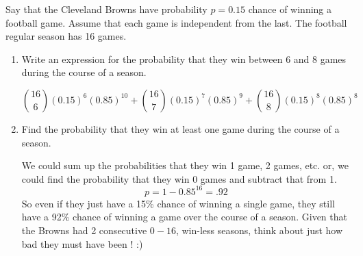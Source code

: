 \question Say that the Cleveland Browns have probability $p = 0.15$ chance of winning a football game. Assume that each game is independent from the last. The football regular season has 16 games.
\begin{enumerate}[label=(\alph*)]
    \item Write an expression for the probability that they win between $6$ and $8$ games during the course of a season. 
    \begin{solution} [.5 cm]
    \[\binom{16}{6}(0.15)^6(0.85)^{10} + \binom{16}{7}(0.15)^7(0.85)^9 + \binom{16}{8}(0.15)^8(0.85)^8\]
    \end{solution}
    \item Find the probability that they win at least one game during the course of a season. 
    \begin{solution} [.5 cm]
    We could sum up the probabilities that they win 1 game, 2 games, etc. or, we could find the probability that they win 0 games and subtract that from 1. \[p = 1 - 0.85^{16} = .92\] 
    So even if they just have a 15\% chance of winning  a single game, they still have a 92\% chance of winning a game over the course of a season. Given that the Browns had 2 consecutive $0-16$, win-less seasons, think about just how bad they must have been ! :)
    \end{solution}
\end{enumerate}
